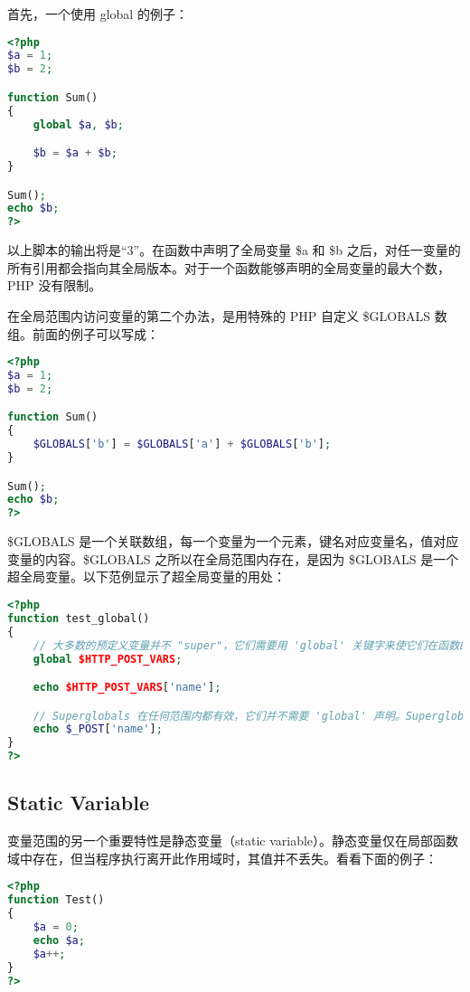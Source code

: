 首先，一个使用 global 的例子：


\begin{lstlisting}[language=PHP]
<?php
$a = 1;
$b = 2;

function Sum()
{
    global $a, $b;

    $b = $a + $b;
}

Sum();
echo $b;
?>
\end{lstlisting}

以上脚本的输出将是“3”。在函数中声明了全局变量 \$a 和 \$b 之后，对任一变量的所有引用都会指向其全局版本。对于一个函数能够声明的全局变量的最大个数，PHP 没有限制。

在全局范围内访问变量的第二个办法，是用特殊的 PHP 自定义 \$GLOBALS 数组。前面的例子可以写成：



\begin{lstlisting}[language=PHP]
<?php
$a = 1;
$b = 2;

function Sum()
{
    $GLOBALS['b'] = $GLOBALS['a'] + $GLOBALS['b'];
}

Sum();
echo $b;
?>
\end{lstlisting}

\$GLOBALS 是一个关联数组，每一个变量为一个元素，键名对应变量名，值对应变量的内容。\$GLOBALS 之所以在全局范围内存在，是因为 \$GLOBALS 是一个超全局变量。以下范例显示了超全局变量的用处：


\begin{lstlisting}[language=PHP]
<?php
function test_global()
{
    // 大多数的预定义变量并不 "super"，它们需要用 'global' 关键字来使它们在函数的本地区域中有效。
    global $HTTP_POST_VARS;

    echo $HTTP_POST_VARS['name'];

    // Superglobals 在任何范围内都有效，它们并不需要 'global' 声明。Superglobals 是在 PHP 4.1.0 引入的。
    echo $_POST['name'];
}
?>
\end{lstlisting}

\subsection{Static Variable}

变量范围的另一个重要特性是静态变量（static variable）。静态变量仅在局部函数域中存在，但当程序执行离开此作用域时，其值并不丢失。看看下面的例子：



\begin{lstlisting}[language=PHP]
<?php
function Test()
{
    $a = 0;
    echo $a;
    $a++;
}
?>
\end{lstlisting}

